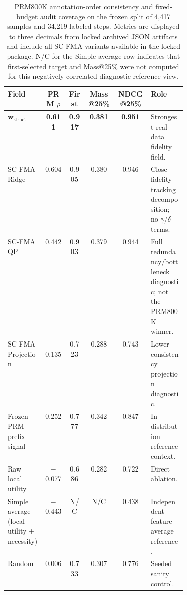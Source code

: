 \documentclass[a4paper,fleqn]{cas-sc}
\newcommand{\wstruct}{\ensuremath{\mathbf{w}_{\mathrm{struct}}}}
\begin{document}
\begin{table}[ht]
\caption{PRM800K annotation-order consistency and fixed-budget audit coverage on the frozen split of 4,417 samples and 34,219 labeled steps. Metrics are displayed to three decimals from locked archived JSON artifacts and include all SC-FMA variants available in the locked package. N/C for the Simple average row indicates that first-selected target and Mass@25\% were not computed for this negatively correlated diagnostic reference view.}
\label{tab:prm800k-audit}
\centering
\scriptsize
\renewcommand{\arraystretch}{1.08}
\begin{tabular}{Z{0.21\linewidth}ccccZ{0.20\linewidth}}
\toprule
\textbf{Field} & \textbf{PRM $\rho$} & \textbf{First} & \textbf{Mass@25\%} & \textbf{NDCG@25\%} & \textbf{Role} \\
\midrule
\wstruct{} & \textbf{0.611} & \textbf{0.917} & \textbf{0.381} & \textbf{0.951} & Strongest real-data fidelity field. \\
SC-FMA Ridge & 0.604 & 0.905 & 0.380 & 0.946 & Close fidelity-tracking decomposition; no $\gamma/\delta$ terms. \\
SC-FMA QP & 0.442 & 0.903 & 0.379 & 0.944 & Full redundancy/bottleneck diagnostic; not the PRM800K winner. \\
SC-FMA Projection & $-$0.135 & 0.723 & 0.288 & 0.743 & Lower-consistency projection diagnostic. \\
Frozen PRM prefix signal & 0.252 & 0.777 & 0.342 & 0.847 & In-distribution reference context. \\
Raw local utility & $-$0.077 & 0.686 & 0.282 & 0.722 & Direct ablation. \\
Simple average (local utility + necessity) & $-$0.443 & N/C & N/C & 0.438 & Independent feature-average reference. \\
Random & 0.006 & 0.733 & 0.307 & 0.776 & Seeded sanity control. \\
\bottomrule
\end{tabular}
\end{table}
\end{document}
